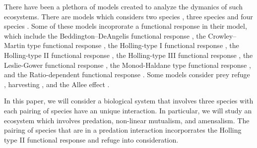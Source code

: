 There have been a plethora of models created to analyze the dymanics of such ecosystems. There are models which considers two species \cite{GHOSH2017110, CHEN20122790, YU2012208167, HUANG2006672, AZIZALAOUI20031069, XIAO200614, SEN201212, CANTRELL2001206, CHEN20092905, CHEN2010246, KAR2005681, CHATTOPADHYAY1996287, KAR2003125}, three species \cite{GAKKHAR201654, PANJA2022100153, MENG2014810, ALIDOUSTI2020109688, PEET2005491, SARWARDI2012133, PRIYADARSHI20133202, GAKKHAR2005105, GAKKHAR2007808, Mukherjee2013, DHAKNEMUNDE2012, CHATTOPADHYAY200345, PANJAMONDAL2015, PANJA2017389, KHAJANCHI2017193, JANA2017350} and four species \cite{JANA2021100942}. Some of these models incoprorate a functional response in their model, which include the Beddington–DeAngelis functional response \cite{CANTRELL2001206}, the Crowley–Martin type functional response \cite{MENG2014810}, the Holling-type I functional response \cite{JANA2021100942, Mukherjee2013, CHATTOPADHYAY200345}, the Holling-type II functional response \cite{GAKKHAR201654, PANJA2022100153, JANA2021100942, GHOSH2017110, YU2012208167, HUANG2006672, AZIZALAOUI20031069, CHEN2010246, SARWARDI2012133, PRIYADARSHI20133202, GAKKHAR2005105, GAKKHAR2007808, Mukherjee2013, CHATTOPADHYAY200345, PANJAMONDAL2015, JANA2017350}, the Holling-type III functional response \cite{CHATTOPADHYAY200345}, the Leslie-Gower functional response \cite{YU2012208167, AZIZALAOUI20031069, PRIYADARSHI20133202}, the Monod-Haldane type functional response \cite{ALIDOUSTI2020109688}, and the Ratio-dependent functional response \cite{XIAO200614, SEN201212, CANTRELL2001206, KHAJANCHI2017193}. Some models consider prey refuge \cite{GAKKHAR201654, PANJA2022100153, GHOSH2017110, CHEN20122790, HUANG2006672, CHEN20092905, CHEN2010246, KAR2005681, SARWARDI2012133, Mukherjee2013, KHAJANCHI2017193, JANA2017350}, harvesting \cite{XIAO200614, KAR2003125, PANJA2017389}, and the Allee effect \cite{SEN201212}.

In this paper, we will consider a biological system that involves three species with each pairing of species have an unique interaction. In particular, we will study an ecosystem which involves predation, non-linear mutualism, and amensalism. The pairing of species that are in a predation interaction incorporrates the Holling type II functional response and refuge into consideration.  
